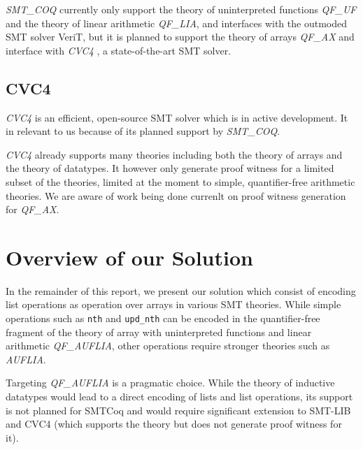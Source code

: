 \documentclass[onecolumn, preprint]{sigplanconf}
\begin{document}
\emph{SMT\_COQ} currently only support the theory of uninterpreted functions \emph{QF\_UF} and the theory of linear arithmetic \emph{QF\_LIA}, and interfaces with the outmoded SMT solver VeriT, but it is planned to support the theory of arrays \emph{QF\_AX} and interface with \emph{CVC4} \citep{CVC4}, a state-of-the-art SMT solver.

\subsection{CVC4}
\emph{CVC4} is an efficient, open-source SMT solver which is in active development. It in relevant to us because of its planned support by \emph{SMT\_COQ}.

\emph{CVC4} already supports many theories including both the theory of arrays and the theory of datatypes. It however only generate proof witness for a limited subset of the theories, limited at the moment to simple, quantifier-free arithmetic theories. We are aware of work being done currenlt on  proof witness generation for \emph{QF\_AX}.


\section{Overview of our Solution}
\label{sec:solution}

In the remainder of this report, we present our solution which consist of encoding list operations as operation over arrays in various SMT theories. While simple operations such as \texttt{nth} and \texttt{upd\_nth} can be encoded in the quantifier-free fragment of the theory of array with uninterpreted functions and linear arithmetic \emph{QF\_AUFLIA}, other operations require stronger theories such as \emph{AUFLIA}. 

Targeting \emph{QF\_AUFLIA} is a pragmatic choice. While the theory of inductive datatypes would lead to a direct encoding of lists and list operations, its support is not planned for SMTCoq and would require significant extension to SMT-LIB and CVC4 (which supports the theory but does not generate proof witness for it). 

\end{document}
